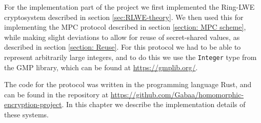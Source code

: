 \documentclass[../main.tex]{subfiles}
\begin{document}
\noindent For the implementation part of the project we first implemented the Ring-LWE cryptosystem described in section \ref{sec:RLWE-theory}. We then used this for implementing the MPC protocol described in section \ref{section: MPC scheme}, while making slight deviations to allow for reuse of secret-shared values, as described in section \ref{section: Reuse}.
For this protocol we had to be able to represent arbitrarily large integers, and to do this we use the \lstinline{Integer} type from the GMP library, which can be found at \url{https://gmplib.org/}.

The code for the protocol was written in the programming language Rust, and can be found in the repository at \url{https://github.com/Gabaa/homomorphic-encryption-project}.
In this chapter we describe the implementation details of these systems.
\end{document}
